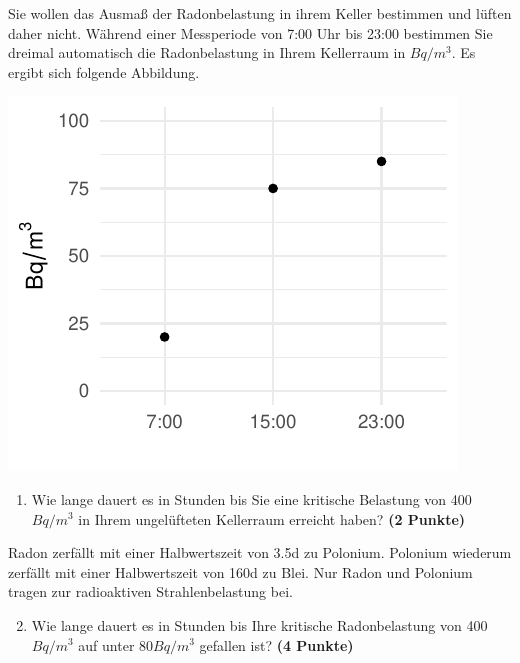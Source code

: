 \documentclass[a4paper, 9pt]{scrartcl}\usepackage[]{graphicx}\usepackage[]{xcolor}
\makeatletter
\def\maxwidth{ %
  \ifdim\Gin@nat@width>\linewidth
    \linewidth
  \else
    \Gin@nat@width
  \fi
}
\newenvironment{knitrout}{}{} %
\makeatother
\begin{document}
Sie wollen das Ausma{\ss} der Radonbelastung in ihrem Keller bestimmen und
l{\"u}ften daher nicht. W{\"a}hrend einer Messperiode von 7:00 Uhr bis
23:00 bestimmen Sie dreimal automatisch die Radonbelastung in
Ihrem Kellerraum in $Bq/m^3$. Es ergibt sich folgende Abbildung.

\begin{knitrout}
\color{fgcolor}

{\centering \includegraphics[width=\maxwidth]{img/math-10-1} 

}


\end{knitrout}

\vspace{-0.75cm}

\begin{enumerate}
\item Wie lange dauert es in Stunden bis Sie eine kritische Belastung von
  400$Bq/m^3$ in Ihrem ungel{\"u}fteten Kellerraum erreicht haben?
  \textbf{(2 Punkte)}
\end{enumerate}

Radon zerf{\"a}llt mit einer Halbwertszeit von 3.5d zu
Polonium. Polonium wiederum zerf{\"a}llt mit einer Halbwertszeit von
160d zu Blei. Nur Radon und Polonium tragen zur
radioaktiven Strahlenbelastung bei.

\begin{enumerate}
  \setcounter{enumi}{1}
\item Wie lange dauert es in Stunden bis Ihre kritische Radonbelastung von
  400$Bq/m^3$ auf unter 80$Bq/m^3$ gefallen ist?
  \textbf{(4 Punkte)}
\end{enumerate}
\end{document}

